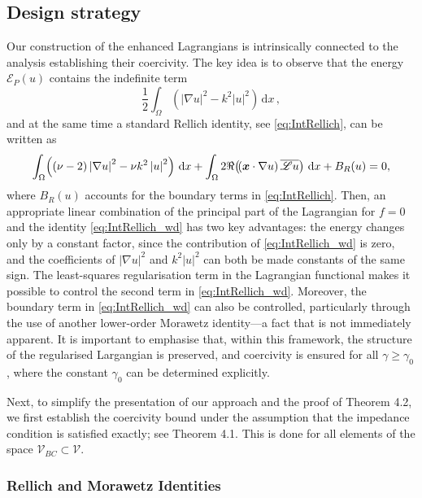 \documentclass[twoside,11pt]{article}
\def\dimx{\nu }
\def\d{{\mathrm d}}
\def\L{{\mathscr{L}}}
\newcommand{\qp}[1]{\ensuremath{\!\left({#1}\right)}}
\newcommand{\norm}[1]{\ensuremath{\left|#1\right|}}
\renewcommand{\vec}[1]{\boldsymbol{#1}}
\def\Vc{{\mathscr V}}
\def\Vcbc{{\mathscr V}_{BC}}
\def\L{{\mathscr{L}}}
\begin{document}
{\subsection*{Design strategy}
\label{sec:design}
Our construction of the enhanced Lagrangians  is intrinsically connected to the analysis establishing their coercivity. 
The key idea is to observe that the energy $ \mathcal{E}_P (u)$ contains the indefinite term   
\begin{equation}\label{energy_wd}
    \frac{1}{2} \int_\Omega \qp{\norm{\nabla u}^2 - k^2 \norm{u}^2} \,  \d x \, , 
\end{equation}
and at the same time a standard Rellich identity, see \eqref{eq:IntRellich}, can be written as
 \begin{equation}
      \label{eq:IntRellich_wd}
    \int_\Omega \qp{(\dimx  -2) \norm{\nabla u}^2 - \dimx k^2 \norm{u}^2} \,  \d x \\
     + \int_\Omega 2 \Re\qp{\qp{\vec{x} \cdot \nabla u} \overline{\L  u}} \,  \d x
    + B_R(u)=0,
 	 \end{equation}
where $ B_R(u)$ accounts for the boundary terms in \eqref{eq:IntRellich}. 
Then, an appropriate linear combination of the principal part of the Lagrangian for $f=0$  and {  the identity} \eqref{eq:IntRellich_wd} 
has two {  key advantages}: the energy {  changes} only by a constant factor, since the contribution of \eqref{eq:IntRellich_wd}  is zero,
and the coefficients  of $\norm{\nabla u}^2$ and $k^2 \norm{u}^2 $ {  can both be made} constants of the same sign. 
The least-squares regularisation term in the Lagrangian  functional {  makes it possible} to control the second term in \eqref{eq:IntRellich_wd}. 
{  Moreover,} the boundary term in \eqref{eq:IntRellich_wd} can also be controlled, {  particularly} through the use of {  another} 
lower-order Morawetz identity---a fact that is not immediately apparent. It is important to emphasise that, within this framework, the structure 
of the regularised Largangian is preserved, and coercivity is ensured for all $\gamma \geq \gamma_0$, where the constant $ \gamma_0$
can be determined explicitly.  

 {Next, to simplify the presentation of our approach and the proof of Theorem 4.2, we first establish the coercivity bound under the assumption that the impedance condition is satisfied exactly; see Theorem 4.1. This is done for all elements of the space $\Vcbc \subset \Vc$.}




\subsubsection*{Rellich and Morawetz Identities}

}
\end{document}
